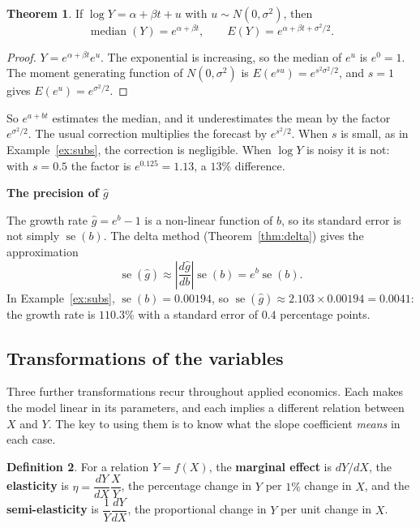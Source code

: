 \documentclass[11pt,a4paper]{article}
\numberwithin{equation}{section}
\theoremstyle{definition}
\newtheorem{thm}{Theorem}[subsection]
\newtheorem{defn}[thm]{Definition}
\newcommand{\subhead}[1]{%
  \par\medskip\noindent\textbf{#1}\par\nobreak\smallskip}
\begin{document}
\begin{thm}
\label{thm:lognormal}
If $\log Y = \alpha + \beta t + u$ with $u \sim N(0, \sigma^2)$, then
\[
\operatorname{median}(Y) = e^{\alpha + \beta t}, \qquad E(Y) = e^{\alpha + \beta t + \sigma^2/2} .
\]
\end{thm}

\begin{proof}
$Y = e^{\alpha + \beta t}e^{u}$. The exponential is increasing, so the median of $e^u$ is $e^0 = 1$. The moment generating function of
$N(0, \sigma^2)$ is $E(e^{su}) = e^{s^2\sigma^2/2}$, and $s = 1$ gives $E(e^u) = e^{\sigma^2/2}$.
\end{proof}

So $e^{a + bt}$ estimates the median, and it underestimates the mean by the factor $e^{\sigma^2/2}$. The usual correction multiplies the forecast by
$e^{s^2/2}$. When $s$ is small, as in Example~\ref{ex:subs}, the correction is negligible. When $\log Y$ is noisy it is not: with $s = 0.5$ the
factor is $e^{0.125} = 1.13$, a $13\%$ difference.

\subhead{The precision of $\hat g$}
The growth rate $\hat g = e^b - 1$ is a non-linear function of $b$, so its standard error is not simply $\operatorname{se}(b)$. The delta method
(Theorem~\ref{thm:delta}) gives the approximation
\[
\operatorname{se}(\hat g) \approx \left|\frac{d\hat g}{db}\right|\operatorname{se}(b) = e^b\operatorname{se}(b) .
\]
In Example~\ref{ex:subs}, $\operatorname{se}(b) = 0.00194$, so $\operatorname{se}(\hat g) \approx 2.103 \times 0.00194 = 0.0041$: the growth rate is
$110.3\%$ with a standard error of $0.4$ percentage points.

\subsection{Transformations of the variables}
\label{ssec:transform}

Three further transformations recur throughout applied economics. Each makes the model linear in its parameters, and each implies a
different relation between $X$ and $Y$. The key to using them is to know what the slope coefficient \emph{means} in each case.

\begin{defn}
For a relation $Y = f(X)$, the \textbf{marginal effect} is $dY/dX$, the \textbf{elasticity} is $\eta = \dfrac{dY}{dX}\dfrac{X}{Y}$, the percentage
change in $Y$ per $1\%$ change in $X$, and the \textbf{semi-elasticity} is $\dfrac{1}{Y}\dfrac{dY}{dX}$, the proportional change in $Y$ per unit
change in $X$.
\end{defn}
\end{document}
